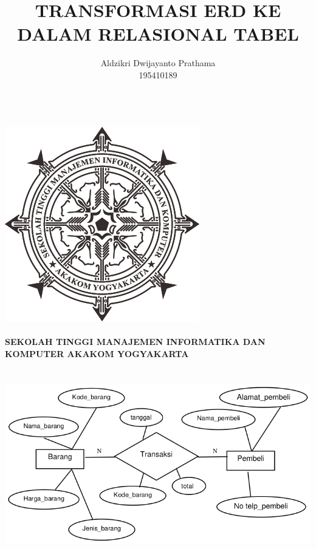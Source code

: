 \documentclass[a4paper,12pt]{article}
\begin{document}
\title{TRANSFORMASI ERD KE DALAM RELASIONAL TABEL}
\author{Aldzikri Dwijayanto Prathama
	\\195410189}
\makeatletter
\begin{titlepage}
	\begin{center}
        {\LARGE \bfseries \@title }\\[14ex]
		\includegraphics[scale=.8]{logo}\\[4ex]
		{\large \@author}\\[20ex]
		{\large \bfseries {SEKOLAH TINGGI MANAJEMEN INFORMATIKA DAN KOMPUTER
				AKAKOM YOGYAKARTA}}
	\end{center}


\end{titlepage}
\makeatother

\section*{}
\begin{center}
    \includegraphics[width=\linewidth]{1.png} 
\end{center}
\end{document}
